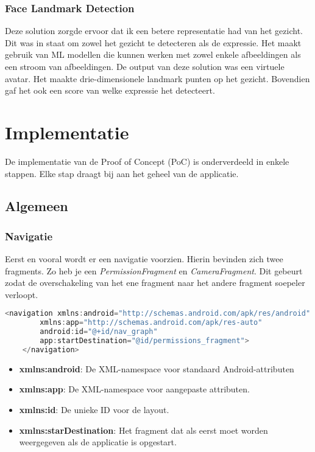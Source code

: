 \subsubsection{Face Landmark Detection}
Deze solution zorgde ervoor dat ik een betere representatie had van het gezicht. Dit was in staat om zowel het gezicht te detecteren als de expressie. Het maakt gebruik van ML modellen die kunnen werken met zowel enkele afbeeldingen als een stroom van afbeeldingen. De output van deze solution was een virtuele avatar. Het maakte drie-dimensionele landmark punten op het gezicht. Bovendien gaf het ook een score van welke expressie het detecteert. 

\section{Implementatie}
De implementatie van de Proof of Concept (PoC) is onderverdeeld in enkele stappen. Elke stap draagt bij aan het geheel van de applicatie.

\subsection{Algemeen}
\subsubsection{Navigatie}
Eerst en vooral wordt er een navigatie voorzien. Hierin bevinden zich twee fragments. Zo heb je een \emph{PermissionFragment} en \emph{CameraFragment}. Dit gebeurt zodat de overschakeling van het ene fragment naar het andere fragment soepeler verloopt.
\begin{lstlisting}[language=Kotlin, caption=nav\_graph.xml]
    <navigation xmlns:android="http://schemas.android.com/apk/res/android"
        xmlns:app="http://schemas.android.com/apk/res-auto"
        android:id="@+id/nav_graph"
        app:startDestination="@id/permissions_fragment"> 
    </navigation>
\end{lstlisting}
\begin{itemize}
    \item \textbf{xmlns:android}: De XML-namespace voor standaard Android-attributen
    \item \textbf{xmlns:app}: De XML-namespace voor aangepaste attributen.
    \item \textbf{xmlns:id}: De unieke ID voor de layout.
    \item \textbf{xmlns:starDestination}: Het fragment dat als eerst moet worden weergegeven als de applicatie is opgestart.
\end{itemize}

